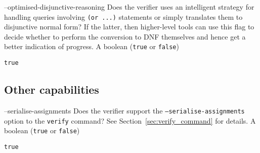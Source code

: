 \clOutputOption
{--optimised-disjunctive-reasoning}
{Does the verifier uses an intelligent strategy for handling queries involving \texttt{(or ...)} statements or simply translates them to disjunctive normal form? If the latter, then higher-level tools can use this flag to decide whether to perform the conversion to DNF themselves and hence get a better indication of progress.
}
{A boolean (\texttt{true} or \texttt{false})}
\begin{lstlisting}[style=bash]
%*\exampleVerifier* supports --optimised-disjunctive-reasoning
true
\end{lstlisting}

\subsection{Other capabilities}
\label{sec:other-capabilities}

\clOutputOption
{--serialise-assignments}
{Does the verifier support the \texttt{--serialise-assignments} option to the \texttt{verify} command? See Section~\ref{sec:verify_command} for details.}
{A boolean (\texttt{true} or \texttt{false})}
\begin{lstlisting}[style=bash]
%*\exampleVerifier* supports --serialise-assignments
true
\end{lstlisting}




